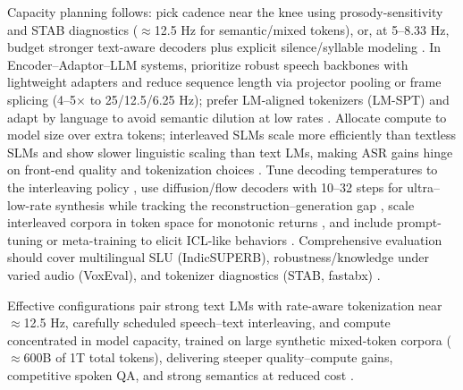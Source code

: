 \documentclass{article}
\begin{document}
Capacity planning follows: pick cadence near the knee using prosody-sensitivity and STAB diagnostics ($\approx$12.5 Hz for semantic/mixed tokens), or, at 5--8.33 Hz, budget stronger text-aware decoders plus explicit silence/syllable modeling \cite{vashishth2024stabspeechtokenizerassessmentbenchmark,onda2025benchmarkingprosodyencodingdiscretespeec}. In Encoder--Adaptor--LLM systems, prioritize robust speech backbones with lightweight adapters and reduce sequence length via projector pooling or frame splicing (4--5$\times$ to 25/12.5/6.25 Hz); prefer LM-aligned tokenizers (LM-SPT) and adapt by language to avoid semantic dilution at low rates \cite{wang2023slmbridgethingapbetweenspeechtextfoundat,jo2025lmsptalignedsemanticdistillationspeechto,zhang2025impactframeratesspeechtokenizercasestudy}. Allocate compute to model size over extra tokens; interleaved SLMs scale more efficiently than textless SLMs and show slower linguistic scaling than text LMs, making ASR gains hinge on front-end quality and tokenization choices \cite{cuervo2024scalingpropertiesspeechlanguagemodels,turetzky2024lastlanguagemodelawarespeechtokenization,kando2025exploringeffectsegmentationvocabularysiz,maimon2025scalinganalysisinterleavedspeechtextlang,zeng2024scalingspeechtextpretrainingsyntheticint}. Tune decoding temperatures to the interleaving policy \cite{cui2025thinkbeforeyoutalkenhancingmeaningfuldia}, use diffusion/flow decoders with 10--32 steps for ultra--low-rate synthesis while tracking the reconstruction--generation gap \cite{wang2025tadicodectextawarediffusionspeechtokeniz}, scale interleaved corpora in token space for monotonic returns \cite{zeng2024scalingspeechtextpretrainingsyntheticint}, and include prompt-tuning or meta-training to elicit ICL-like behaviors \cite{hsu2024exploringcontextlearningtextlessspeechla}. Comprehensive evaluation should cover multilingual SLU (IndicSUPERB), robustness/knowledge under varied audio (VoxEval), and tokenizer diagnostics (STAB, fastabx) \cite{entry2025indicsuperbspeechprocessinguniversalperf,cui2025voxevalbenchmarkingknowledgeunderstandin,vashishth2024stabspeechtokenizerassessmentbenchmark,poli2025fastabxlibraryefficientcomputationabxdis}.

Effective configurations pair strong text LMs with rate-aware tokenization near $\approx$12.5 Hz, carefully scheduled speech--text interleaving, and compute concentrated in model capacity, trained on large synthetic mixed-token corpora ($\approx$600B of 1T total tokens), delivering steeper quality--compute gains, competitive spoken QA, and strong semantics at reduced cost \cite{maimon2025scalinganalysisinterleavedspeechtextlang,zhang2024speechtokenizerunifiedspeechtokenizerlar,zeng2024scalingspeechtextpretrainingsyntheticint,cuervo2024scalingpropertiesspeechlanguagemodels}.
\end{document}
